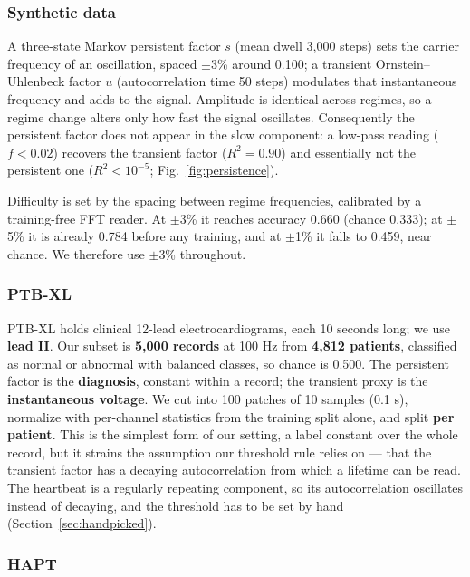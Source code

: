 \subsubsection{Synthetic data}
A three-state Markov persistent factor $s$ (mean dwell 3{,}000 steps) sets the carrier frequency of an oscillation, spaced $\pm$3\% around 0.100; a transient Ornstein--Uhlenbeck factor $u$ (autocorrelation time 50 steps) modulates that instantaneous frequency and adds to the signal. Amplitude is identical across regimes, so a regime change alters only how fast the signal oscillates. Consequently the persistent factor does not appear in the slow component: a low-pass reading ($f<0.02$) recovers the transient factor ($R^2=0.90$) and essentially not the persistent one ($R^2<10^{-5}$; Fig.~\ref{fig:persistence}).

Difficulty is set by the spacing between regime frequencies, calibrated by a training-free FFT reader. At $\pm$3\% it reaches accuracy 0.660 (chance 0.333); at $\pm$5\% it is already 0.784 before any training, and at $\pm$1\% it falls to 0.459, near chance. We therefore use $\pm$3\% throughout.

\subsubsection{PTB-XL}

PTB-XL holds clinical 12-lead electrocardiograms, each 10 seconds long; we use \textbf{lead II}. Our subset is \textbf{5,000 records} at 100 Hz from \textbf{4,812 patients}, classified as normal or abnormal with balanced classes, so chance is 0.500. The persistent factor is the \textbf{diagnosis}, constant within a record; the transient proxy is the \textbf{instantaneous voltage}. We cut into 100 patches of 10 samples (0.1 s), normalize with per-channel statistics from the training split alone, and split \textbf{per patient}. This is the simplest form of our setting, a label constant over the whole record, but it strains the assumption our threshold rule relies on --- that the transient factor has a decaying autocorrelation from which a lifetime can be read. The heartbeat is a regularly repeating component, so its autocorrelation oscillates instead of decaying, and the threshold has to be set by hand (Section~\ref{sec:handpicked}).

\subsubsection{HAPT}

